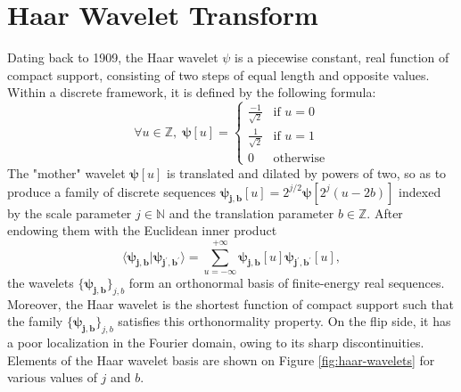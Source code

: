 \documentclass{article}
\begin{document}
\section{Haar Wavelet Transform}\label{sec:haar}
Dating back to 1909, the Haar wavelet $\psi$ is a piecewise constant, real function of compact
support, consisting of two steps of equal length and opposite values. Within a discrete framework,
it is defined by the following formula:
\begin{equation}
\forall u \in \mathbb{Z}, \;
\boldsymbol{\psi}[u] = \left\{ \begin{array}{cl}
\frac{-1}{\sqrt{2}} & \mbox{if }u = 0\\
\frac{1}{\sqrt{2}} & \mbox{if }u = 1\\
0 & \mbox{otherwise}
\end{array}\right.
\end{equation}
The "mother" wavelet $\boldsymbol{\psi}[u]$ is translated and dilated by powers of two, so as to
produce a family of discrete sequences
$\boldsymbol{\psi_{j,b}}[u] = 2^{j/2} \boldsymbol{\psi}[2^j (u - 2b)]$
indexed by the scale parameter $j \in \mathbb{N}$ and the translation parameter $b \in \mathbb{Z}$.
After endowing them with the Euclidean inner product
\begin{equation}
\langle \boldsymbol{\psi_{j,b}} \vert \boldsymbol{\psi_{j^\prime,b^\prime}} \rangle
 =
 \sum_{u = -\infty}^{+\infty}
 \boldsymbol{\psi_{j, b}}[u]
  \boldsymbol{\psi_{j^\prime,b^\prime}}[u],
\end{equation}
the wavelets $\{\boldsymbol{\psi_{j,b}}\}_{j,b}$ form an orthonormal basis of finite-energy
real sequences.
Moreover, the Haar wavelet is the shortest function of compact support such that the family
$\{\boldsymbol{\psi_{j,b}}\}_{j,b}$ satisfies this orthonormality property.
On the flip side, it has a poor localization in the Fourier domain, owing to its sharp discontinuities.
Elements of the Haar wavelet basis are shown on Figure \ref{fig:haar-wavelets} for various values of $j$ and $b$.
\end{document}
